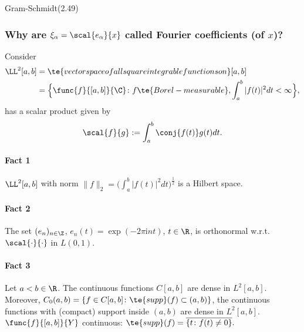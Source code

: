 \begin{algorithm}[H]
    \begin{algorithmic}%
        \ENDFOR
    \end{algorithmic}
    \caption{Gram-Schmidt\hfill(2.49)}\label{2.49}
\end{algorithm}

\subsubsection*{Why are $\xi_\alpha=\scal{e_\alpha}{x}$ called Fourier coefficients (of $x$)?}
Consider 
\begin{align*}
    \LL^2[a,b]&=\te{vector space of all square integrable functions on }[a,b]\\
    &=\Big\{\func{f}{[a,b]}{\C}\colon f\te{ Borel-measurable},\int_a^b|f(t)|^2dt<\infty\Big\},
\end{align*}
has a scalar product given by
\[\scal{f}{g}:=\int_a^b\conj{f(t)}g(t)dt.\]
\paragraph{Fact 1}
$\LL^2[a,b]$ with norm $\|f\|_2=\big(\int_a^b|f(t)|^2dt\big)^\frac{1}{2}$ is a Hilbert space.

\paragraph{Fact 2}
The set $(e_n)_{n\in\Z}$, $e_n(t)=\exp(-2\pi \mathrm{i}nt)$, $t\in\R$, 
is orthonormal w.r.t. $\scal{\cdot}{\cdot}$ in $L(0,1)$.

\paragraph{Fact 3}
Let $a<b\in\R$. The continuous functions $C[a,b]$ are dense in $L^2[a,b]$. 
Moreover, $C_0(a,b)=\{f\in C[a,b]\colon \te{supp}(f)\subset(a,b)\}$, 
the continuous functions with (compact) support inside $(a,b)$ are dense in $L^2[a,b]$. 
 $\func{f}{[a,b]}{Y}$ continuous: $\te{supp}(f)=\overline{\{t\colon f(t)\neq0\}}.$

